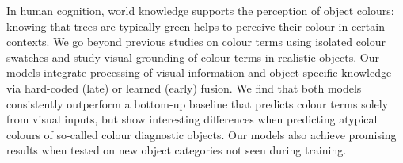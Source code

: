In human cognition, world knowledge supports the perception of object colours: knowing that trees are typically green helps to perceive their colour in certain contexts. We go beyond previous studies on colour terms using isolated colour swatches and study visual grounding of colour terms in realistic objects. Our models integrate processing of visual information and object-specific knowledge via hard-coded (late) or learned (early) fusion. We find that both models consistently outperform a bottom-up baseline that predicts colour terms solely from visual inputs, but show interesting differences when predicting atypical colours of so-called colour diagnostic objects. Our models also achieve promising results when tested on new object categories not seen during training.
